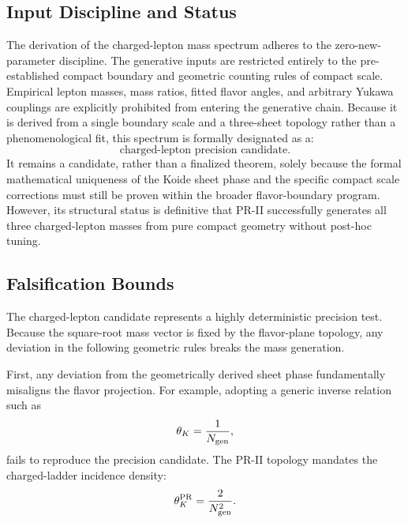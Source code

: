 \documentclass[11pt]{article}
\begin{document}
\subsection{Input Discipline and Status}
\label{sec:pr2_charged_lepton_input_discipline_status}

The derivation of the charged-lepton mass spectrum adheres to the zero-new-parameter discipline. The generative inputs are restricted entirely to the pre-established compact boundary and geometric counting rules of compact scale. Empirical lepton masses, mass ratios, fitted flavor angles, and arbitrary Yukawa couplings are explicitly prohibited from entering the generative chain. Because it is derived from a single boundary scale and a three-sheet topology rather than a phenomenological fit, this spectrum is formally designated as a:
\begin{equation}
\boxed{
\text{charged-lepton precision candidate}.
}
\end{equation}
It remains a candidate, rather than a finalized theorem, solely because the formal mathematical uniqueness of the Koide sheet phase and the specific compact scale corrections must still be proven within the broader flavor-boundary program. However, its structural status is definitive that PR-II successfully generates all three charged-lepton masses from pure compact geometry without post-hoc tuning.

\subsection{Falsification Bounds}
\label{sec:pr2_charged_lepton_negative_controls}

The charged-lepton candidate represents a highly deterministic precision test. Because the square-root mass vector is fixed by the flavor-plane topology, any deviation in the following geometric rules breaks the mass generation.

First, any deviation from the geometrically derived sheet phase fundamentally misaligns the flavor projection. For example, adopting a generic inverse relation such as
\begin{equation}
\theta_K=\frac{1}{N_{\rm gen}},
\end{equation}
fails to reproduce the precision candidate. The PR-II topology mandates the charged-ladder incidence density:
\begin{equation}
\theta_K^{\rm PR}=\frac{2}{N_{\rm gen}^2}.
\end{equation}
\end{document}
